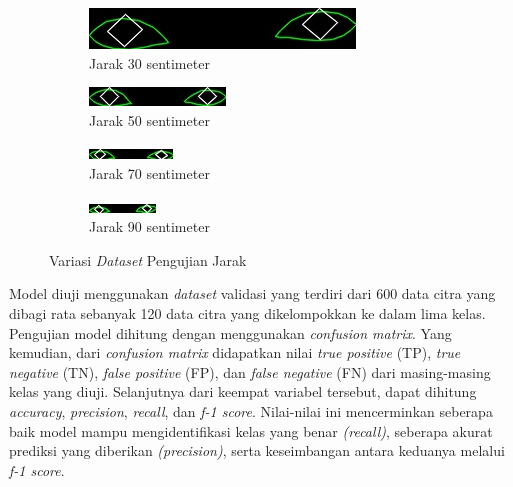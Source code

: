 \begin{figure}[H]
  \centering
  \begin{subfigure}[b]{0.4\linewidth}
      \includegraphics[width=\linewidth]{gambar/bab4/30.jpg}
      \caption{Jarak 30 sentimeter}
      \label{fig:imageaa}
  \end{subfigure}
  \hfill %
  \begin{subfigure}[b]{0.4\linewidth}
    \includegraphics[width=\linewidth]{gambar/bab4/50.jpg}
    \caption{Jarak 50 sentimeter}
    \label{fig:imagebb}
  \end{subfigure}
  \vspace{1cm} %
  \begin{subfigure}[b]{0.4\linewidth}
    \includegraphics[width=\linewidth]{gambar/bab4/70.jpg}
    \caption{Jarak 70 sentimeter}
    \label{fig:imagecc}
  \end{subfigure}
  \begin{subfigure}[b]{0.4\linewidth}
    \includegraphics[width=\linewidth]{gambar/bab4/90.jpg}
    \caption{Jarak 90 sentimeter}
    \label{fig:imagedd}
  \end{subfigure}
  \caption{Variasi \emph{Dataset} Pengujian Jarak}
  \label{fig:Variasi Jarak}
\end{figure}

Model diuji menggunakan \emph{dataset} validasi yang terdiri dari 600 data citra yang dibagi rata sebanyak 120 data citra yang dikelompokkan ke dalam lima kelas. Pengujian model dihitung dengan menggunakan \emph{confusion matrix}. Yang kemudian, dari \emph{confusion matrix} didapatkan nilai \emph{true positive} (TP), \emph{true negative} (TN), \emph{false positive} (FP), dan \emph{false negative} (FN) dari masing-masing kelas yang diuji. Selanjutnya dari keempat variabel tersebut, dapat dihitung \emph{accuracy}, \emph{precision}, \emph{recall}, dan \emph{f-1 score}. Nilai-nilai ini mencerminkan seberapa baik model mampu mengidentifikasi kelas yang benar \emph{(recall)}, seberapa akurat prediksi yang diberikan \emph{(precision)}, serta keseimbangan antara keduanya melalui \emph{f-1 score}. 

